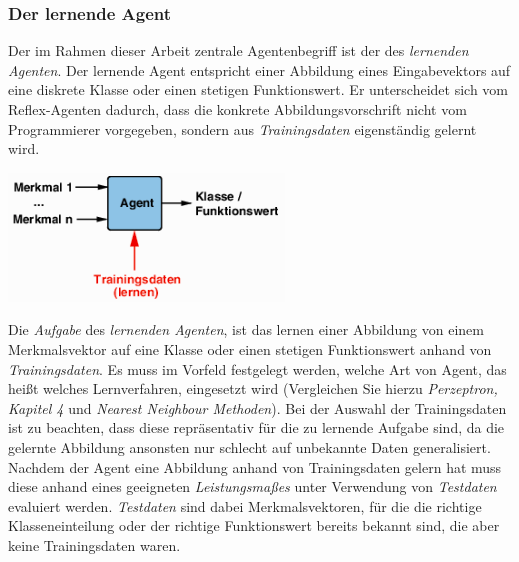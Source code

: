 \documentclass[a4paper]{scrartcl}
\newenvironment{Figure}
  {\par\medskip\noindent\minipage{\linewidth}}
  {\endminipage\par\medskip}
\begin{document}
\begin{multicols}{2}
            \subsubsection{Der lernende Agent}
                Der im Rahmen dieser Arbeit zentrale Agentenbegriff ist der des \emph{lernenden Agenten}. Der lernende Agent entspricht einer Abbildung eines Eingabevektors auf eine diskrete Klasse oder einen stetigen Funktionswert. Er unterscheidet sich vom Reflex-Agenten dadurch, dass die konkrete Abbildungsvorschrift nicht vom Programmierer vorgegeben, sondern aus \emph{Trainingsdaten} eigenständig gelernt wird.
                \begin{Figure}
                   \centering
                   \includegraphics[width=\linewidth]{lernenderagent.png}
                \end{Figure}
                Die \emph{Aufgabe} des \emph{lernenden Agenten}, ist das lernen einer Abbildung von einem Merkmalsvektor auf eine Klasse oder einen stetigen Funktionswert anhand von \emph{Trainingsdaten}. Es muss im Vorfeld festgelegt werden, welche Art von Agent, das heißt welches Lernverfahren, eingesetzt wird (Vergleichen Sie hierzu \emph{Perzeptron, Kapitel 4} und \emph{Nearest Neighbour Methoden}).
                Bei der Auswahl der Trainingsdaten ist zu beachten, dass diese repräsentativ für die zu lernende Aufgabe sind, da die gelernte Abbildung ansonsten nur schlecht auf unbekannte Daten generalisiert.\\
                Nachdem der Agent eine Abbildung anhand von Trainingsdaten gelern hat muss diese anhand eines geeigneten \emph{Leistungsmaßes} unter Verwendung von \emph{Testdaten} evaluiert werden. \emph{Testdaten} sind dabei Merkmalsvektoren, für die  die richtige Klasseneinteilung oder der richtige Funktionswert bereits bekannt sind, die aber keine Trainingsdaten waren.


\end{multicols}
\end{document}
